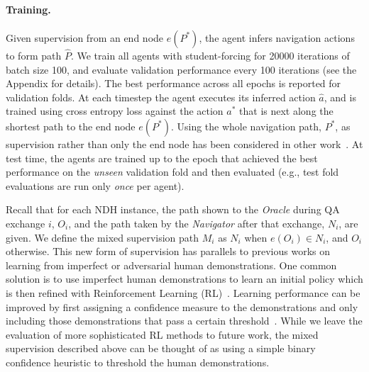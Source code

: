 \documentclass{article}
\newcommand{\task}{NDH}
\newcommand{\nav}{\textit{Navigator}}
\newcommand{\ora}{\textit{Oracle}}
\begin{document}
\paragraph{Training.}
Given supervision from an end node $e(P^*)$, the agent infers navigation actions to form path $\hat{P}$.
We train all agents with student-forcing for 20000 iterations of batch size 100, and evaluate validation performance every 100 iterations (see the Appendix for details).
The best performance across all epochs is reported for validation folds.
At each timestep the agent executes its inferred action $\hat{a}$, and is trained using cross entropy loss against the action $a^*$ that is next along the shortest path to the end node $e(P^*)$.
Using the whole navigation path, $P^*$, as supervision rather than only the end node has been considered in other work~\cite{jain:acl19}.
At test time, the agents are trained up to the epoch that achieved the best performance on the \textit{unseen} validation fold and then evaluated (e.g., test fold evaluations are run only \textit{once} per agent).

Recall that for each \task{} instance, the path shown to the \ora{} during QA exchange $i$, $O_i$, and the path taken by the \nav{} after that exchange, $N_i$, are given.
We define the mixed supervision path $M_i$ as $N_i$ when $e(O_i)\in N_i$, and $O_i$ otherwise.
This new form of supervision has parallels to previous works on learning from imperfect or adversarial human demonstrations.
One common solution is to use imperfect human demonstrations to learn an initial policy which is then refined with Reinforcement Learning (RL)~\cite{taylor2011integrating}.
Learning performance can be improved by first assigning a confidence measure to the demonstrations and only including those demonstrations that pass a certain threshold~\cite{wang2017improving}.
While we leave the evaluation of more sophisticated RL methods to future work, the mixed supervision described above can be thought of as using a simple binary confidence heuristic to threshold the human demonstrations.
\end{document}
